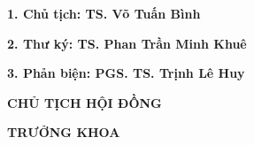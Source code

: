 \begin{titlepage}
\vspace{0.2cm}



{\fontsize{11pt}{13pt}\selectfont
\noindent \textbf{1. Chủ tịch: TS. Võ Tuấn Bình}\par
\vspace{0.18cm}
\noindent \textbf{2. Thư ký: TS. Phan Trần Minh Khuê} \par
\vspace{0.18cm}
\noindent \textbf{3. Phản biện: PGS. TS. Trịnh Lê Huy} \par
}

\vspace{0.7cm}


\vspace{0.7cm}

\begin{center}
\begin{minipage}{0.45\textwidth}
\centering
{\fontsize{15pt}{17pt}\selectfont \textbf{CHỦ TỊCH HỘI ĐỒNG}}
\end{minipage}
\hfill
\begin{minipage}{0.45\textwidth}
\centering
{\fontsize{15pt}{17pt}\selectfont \textbf{TRƯỞNG KHOA}}
\end{minipage}
\end{center}

\end{titlepage}